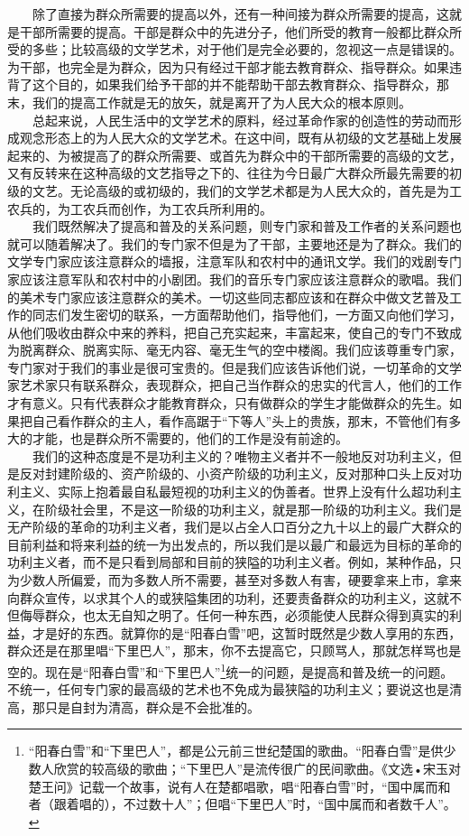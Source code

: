 \documentclass[cn,11pt,chinese]{elegantbook}
\begin{document}
　　除了直接为群众所需要的提高以外，还有一种间接为群众所需要的提高，这就是干部所需要的提高。干部是群众中的先进分子，他们所受的教育一般都比群众所受的多些；比较高级的文学艺术，对于他们是完全必要的，忽视这一点是错误的。为干部，也完全是为群众，因为只有经过干部才能去教育群众、指导群众。如果违背了这个目的，如果我们给予干部的并不能帮助干部去教育群众、指导群众，那末，我们的提高工作就是无的放矢，就是离开了为人民大众的根本原则。\\
　　总起来说，人民生活中的文学艺术的原料，经过革命作家的创造性的劳动而形成观念形态上的为人民大众的文学艺术。在这中间，既有从初级的文艺基础上发展起来的、为被提高了的群众所需要、或首先为群众中的干部所需要的高级的文艺，又有反转来在这种高级的文艺指导之下的、往往为今日最广大群众所最先需要的初级的文艺。无论高级的或初级的，我们的文学艺术都是为人民大众的，首先是为工农兵的，为工农兵而创作，为工农兵所利用的。\\
　　我们既然解决了提高和普及的关系问题，则专门家和普及工作者的关系问题也就可以随着解决了。我们的专门家不但是为了干部，主要地还是为了群众。我们的文学专门家应该注意群众的墙报，注意军队和农村中的通讯文学。我们的戏剧专门家应该注意军队和农村中的小剧团。我们的音乐专门家应该注意群众的歌唱。我们的美术专门家应该注意群众的美术。一切这些同志都应该和在群众中做文艺普及工作的同志们发生密切的联系，一方面帮助他们，指导他们，一方面又向他们学习，从他们吸收由群众中来的养料，把自己充实起来，丰富起来，使自己的专门不致成为脱离群众、脱离实际、毫无内容、毫无生气的空中楼阁。我们应该尊重专门家，专门家对于我们的事业是很可宝贵的。但是我们应该告诉他们说，一切革命的文学家艺术家只有联系群众，表现群众，把自己当作群众的忠实的代言人，他们的工作才有意义。只有代表群众才能教育群众，只有做群众的学生才能做群众的先生。如果把自己看作群众的主人，看作高踞于“下等人”头上的贵族，那末，不管他们有多大的才能，也是群众所不需要的，他们的工作是没有前途的。\\
　　我们的这种态度是不是功利主义的？唯物主义者并不一般地反对功利主义，但是反对封建阶级的、资产阶级的、小资产阶级的功利主义，反对那种口头上反对功利主义、实际上抱着最自私最短视的功利主义的伪善者。世界上没有什么超功利主义，在阶级社会里，不是这一阶级的功利主义，就是那一阶级的功利主义。我们是无产阶级的革命的功利主义者，我们是以占全人口百分之九十以上的最广大群众的目前利益和将来利益的统一为出发点的，所以我们是以最广和最远为目标的革命的功利主义者，而不是只看到局部和目前的狭隘的功利主义者。例如，某种作品，只为少数人所偏爱，而为多数人所不需要，甚至对多数人有害，硬要拿来上市，拿来向群众宣传，以求其个人的或狭隘集团的功利，还要责备群众的功利主义，这就不但侮辱群众，也太无自知之明了。任何一种东西，必须能使人民群众得到真实的利益，才是好的东西。就算你的是“阳春白雪”吧，这暂时既然是少数人享用的东西，群众还是在那里唱“下里巴人”，那末，你不去提高它，只顾骂人，那就怎样骂也是空的。现在是“阳春白雪”和“下里巴人”\footnote[9]{ “阳春白雪”和“下里巴人”，都是公元前三世纪楚国的歌曲。“阳春白雪”是供少数人欣赏的较高级的歌曲；“下里巴人”是流传很广的民间歌曲。《文选•宋玉对楚王问》记载一个故事，说有人在楚都唱歌，唱“阳春白雪”时，“国中属而和者（跟着唱的），不过数十人”；但唱“下里巴人”时，“国中属而和者数千人”。}统一的问题，是提高和普及统一的问题。不统一，任何专门家的最高级的艺术也不免成为最狭隘的功利主义；要说这也是清高，那只是自封为清高，群众是不会批准的。\\
\end{document}
